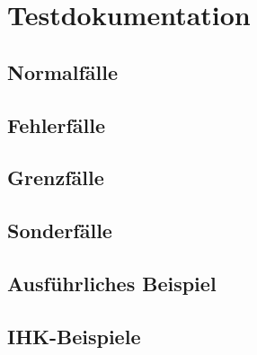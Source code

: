 \chapter{Testdokumentation}\label{ch:testdokumentation}


\section{Normalfälle}\label{sec:normalfaelle}
\section{Fehlerfälle}\label{sec:fehlerfaelle}
\section{Grenzfälle}\label{sec:grenzfaelle}
\section{Sonderfälle}\label{sec:sonderfaelle}


\section{Ausführliches Beispiel}\label{sec:ausf-b}

\section{IHK-Beispiele}\label{sec:ihk-b}
